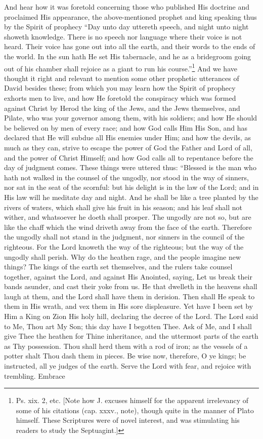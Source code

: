 
And hear how it was foretold concerning those who published His doctrine and proclaimed His appearance, the above-mentioned prophet and king speaking thus by the Spirit of prophecy “Day unto day uttereth speech, and night unto night showeth knowledge. There is no speech nor language where their voice is not heard. Their voice has gone out into all the earth, and their words to the ends of the world. In the sun hath He set His tabernacle, and he as a bridegroom going out of his chamber shall rejoice as a giant to run his course.”\footnote{Ps. xix. 2, etc. [Note how J. excuses himself for the apparent irrelevancy of some of his citations (cap. xxxv., note), though quite in the manner of Plato himself. These Scriptures were of novel interest, and was stimulating his readers to study the Septuagint.]} And we have thought it right and relevant to mention some other prophetic utterances of David besides these; from which you may learn how the Spirit of prophecy exhorts men to live, and how He foretold the conspiracy which was formed against Christ by Herod the king of the Jews, and the Jews themselves, and Pilate, who was your governor among them, with his soldiers; and how He should be believed on by men of every race; and how God calls Him His Son, and has declared that He will subdue all His enemies under Him; and how the devils, as much as they can, strive to escape the power of God the Father and Lord of all, and the power of Christ Himself; and how God calls all to repentance before the day of judgment comes. These things were uttered thus: “Blessed is the man who hath not walked in the counsel of the ungodly, nor stood in the way of sinners, nor sat in the seat of the scornful: but his delight is in the law of the Lord; and in His law will he meditate day and night. And he shall be like a tree planted by the rivers of waters, which shall give his fruit in his season; and his leaf shall not wither, and whatsoever he doeth shall prosper. The ungodly are not so, but are like the chaff which the wind driveth away from the face of the earth. Therefore the ungodly shall not stand in the judgment, nor sinners in the council of the righteous. For the Lord knoweth the way of the righteous; but the way of the ungodly shall perish. Why do the heathen rage, and the people imagine new things? The kings of the earth set themselves, and the rulers take counsel together, against the Lord, and against His Anointed, saying, Let us break their bands asunder, and cast their yoke from us. He that dwelleth in the heavens shall laugh at them, and the Lord shall have them in derision. Then shall He speak to them in His wrath, and vex them in His sore displeasure. Yet have I been set by Him a King on Zion His holy hill, declaring the decree of the Lord. The Lord said to Me, Thou art My Son; this day have I begotten Thee. Ask of Me, and I shall give Thee the heathen for Thine inheritance, and the uttermost parts of the earth as Thy possession. Thou shall herd them with a rod of iron; as the vessels of a potter shalt Thou dash them in pieces. Be wise now, therefore, O ye kings; be instructed, all ye judges of the earth. Serve the Lord with fear, and rejoice with trembling. Embrace 